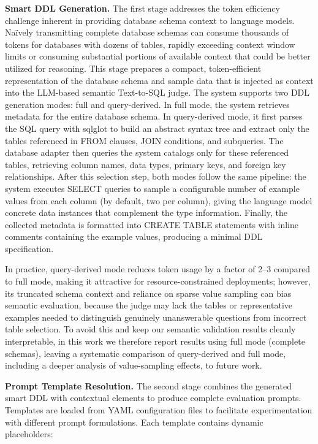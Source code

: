 \documentclass[]{einformatica}
\begin{document}
\textbf{Smart DDL Generation.} The first stage addresses the token efficiency challenge inherent in providing database schema context to language models. Naïvely transmitting complete database schemas can consume thousands of tokens for databases with dozens of tables, rapidly exceeding context window limits or consuming substantial portions of available context that could be better utilized for reasoning. This stage prepares a compact, token-efficient representation of the database schema and sample data that is injected as context into the LLM-based semantic Text-to-SQL judge. The system supports two DDL generation modes: full and query-derived. In full mode, the system retrieves metadata for the entire database schema. In query-derived mode, it first parses the SQL query with sqlglot to build an abstract syntax tree and extract only the tables referenced in FROM clauses, JOIN conditions, and subqueries. The database adapter then queries the system catalogs only for these referenced tables, retrieving column names, data types, primary keys, and foreign key relationships. After this selection step, both modes follow the same pipeline: the system executes SELECT queries to sample a configurable number of example values from each column (by default, two per column), giving the language model concrete data instances that complement the type information. Finally, the collected metadata is formatted into CREATE TABLE statements with inline comments containing the example values, producing a minimal DDL specification.

In practice, query-derived mode reduces token usage by a factor of 2--3 compared to full mode, making it attractive for resource-constrained deployments; however, its truncated schema context and reliance on sparse value sampling can bias semantic evaluation, because the judge may lack the tables or representative examples needed to distinguish genuinely unanswerable questions from incorrect table selection. To avoid this and keep our semantic validation results cleanly interpretable, in this work we therefore report results using full mode (complete schemas), leaving a systematic comparison of query-derived and full mode, including a deeper analysis of value-sampling effects, to future work.

\textbf{Prompt Template Resolution.} The second stage combines the generated smart DDL with contextual elements to produce complete evaluation prompts. Templates are loaded from YAML configuration files to facilitate experimentation with different prompt formulations. Each template contains dynamic placeholders:
\end{document}
